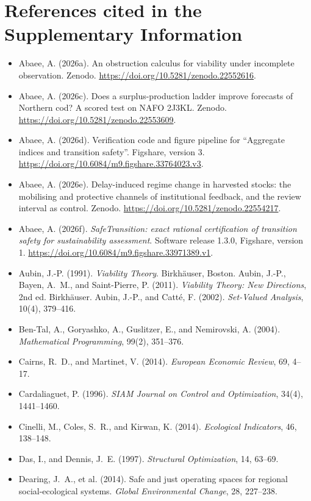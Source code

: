 \section*{References cited in the Supplementary Information}
\begin{itemize}[leftmargin=1.5em,itemsep=1pt]
\item Abaee, A. (2026a). An obstruction calculus for viability under incomplete observation. Zenodo. \url{https://doi.org/10.5281/zenodo.22552616}.
\item Abaee, A. (2026c). Does a surplus-production ladder improve forecasts of Northern cod? A scored test on NAFO 2J3KL. Zenodo. \url{https://doi.org/10.5281/zenodo.22553609}.
\item Abaee, A. (2026d). Verification code and figure pipeline for ``Aggregate indices and transition safety''. Figshare, version 3. \url{https://doi.org/10.6084/m9.figshare.33764023.v3}.
\item Abaee, A. (2026e). Delay-induced regime change in harvested stocks: the mobilising and protective channels of institutional feedback, and the review interval as control. Zenodo. \url{https://doi.org/10.5281/zenodo.22554217}.
\item Abaee, A. (2026f). \emph{SafeTransition: exact rational certification of transition safety for sustainability assessment}. Software release 1.3.0, Figshare, version 1. \url{https://doi.org/10.6084/m9.figshare.33971389.v1}.
\item Aubin, J.-P. (1991). \emph{Viability Theory}. Birkh\"auser, Boston. Aubin, J.-P., Bayen, A.~M., and Saint-Pierre, P. (2011). \emph{Viability Theory: New Directions}, 2nd ed. Birkh\"auser. Aubin, J.-P., and Catt\'e, F. (2002). \emph{Set-Valued Analysis}, 10(4), 379--416.
\item Ben-Tal, A., Goryashko, A., Guslitzer, E., and Nemirovski, A. (2004). \emph{Mathematical Programming}, 99(2), 351--376.
\item Cairns, R.~D., and Martinet, V. (2014). \emph{European Economic Review}, 69, 4--17.
\item Cardaliaguet, P. (1996). \emph{SIAM Journal on Control and Optimization}, 34(4), 1441--1460.
\item Cinelli, M., Coles, S.~R., and Kirwan, K. (2014). \emph{Ecological Indicators}, 46, 138--148.
\item Das, I., and Dennis, J.~E. (1997). \emph{Structural Optimization}, 14, 63--69.
\item Dearing, J.~A., et al. (2014). Safe and just operating spaces for regional social-ecological systems. \emph{Global Environmental Change}, 28, 227--238.

\end{itemize}
